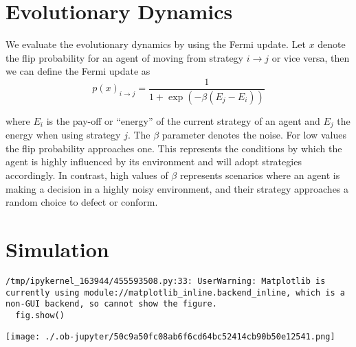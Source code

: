 \documentclass[a4paper, 11pt, twocolumn]{article}
\begin{document}
\section{Evolutionary Dynamics}
\label{sec:org88a29e8}
We  evaluate the  evolutionary dynamics  by using  the Fermi
update. Let \(x\) denote the  flip probability for an agent of
moving from  strategy \(i  \to j\)  or vice  versa, then  we can
define the Fermi update as
\begin{equation}
\label{fermi-update}
p(x)_{i \to j} = \frac{1}{1 + \exp(-\beta (E_j- E_i))}
\end{equation}

where  \(E_i\)  is the  pay-off  or  ``energy'' of  the  current
strategy  of  an  agent  and \(E_j\)  the  energy  when  using
strategy \(j\). The  \(\beta\) parameter denotes the  noise. For low
values the flip probability  approaches one. This represents
the conditions  by which the  agent is highly  influenced by
its environment  and will  adopt strategies  accordingly. In
contrast, high  values of \(\beta\) represents  scenarios where an
agent is  making a decision  in a highly  noisy environment,
and their strategy  approaches a random choice  to defect or
conform.

\section{Simulation}
\label{sec:orgf693e14}

\begin{verbatim}
/tmp/ipykernel_163944/455593508.py:33: UserWarning: Matplotlib is currently using module://matplotlib_inline.backend_inline, which is a non-GUI backend, so cannot show the figure.
  fig.show()
\end{verbatim}

\begin{center}
\texttt{[image: ./.ob-jupyter/50c9a50fc08ab6f6cd64bc52414cb90b50e12541.png]}
\end{center}
\end{document}
